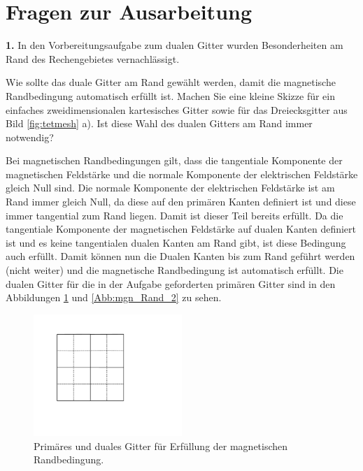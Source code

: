 \documentclass[Protokollheft.tex]{subfiles}
\begin{document}
\section{Fragen zur Ausarbeitung}

\begin{framed}
	\noindent \textbf{1.} In den Vorbereitungsaufgabe zum dualen Gitter wurden
Besonderheiten am Rand des Rechengebietes vernachlässigt.

Wie sollte das duale Gitter am Rand gewählt werden, damit die magnetische
Randbedingung automatisch erfüllt ist. Machen Sie eine kleine Skizze
für ein einfaches zweidimensionalen kartesisches Gitter sowie für
das Dreiecksgitter aus Bild \ref{fig:tetmesh} a). Ist diese Wahl
des dualen Gitters am Rand immer notwendig?\label{exer:autoHomNeumann}
\end{framed}
\noindent
Bei magnetischen Randbedingungen gilt, dass die tangentiale Komponente der magnetischen Feldstärke und die normale Komponente der elektrischen Feldstärke gleich Null sind. Die normale Komponente der elektrischen Feldstärke ist am Rand immer gleich Null, da diese auf den primären Kanten definiert ist und diese immer tangential zum Rand liegen. Damit ist dieser Teil bereits erfüllt. Da die tangentiale Komponente der magnetischen Feldstärke auf dualen Kanten definiert ist und es keine tangentialen dualen Kanten am Rand gibt, ist diese Bedingung auch erfüllt. Damit können nun die Dualen Kanten bis zum Rand geführt werden (nicht weiter) und die magnetische Randbedingung ist automatisch erfüllt. Die dualen Gitter für die in der Aufgabe geforderten primären Gitter sind in den Abbildungen \ref{Abb:mgn_Rand_1} und \ref{Abb:mgn_Rand_2} zu sehen.
\begin{figure}[h]
	\centering
	\includegraphics[trim = 30mm 35mm 70mm 15mm, clip,width=0.5\textwidth]{mgn_Rand_1.pdf}
	\caption{Primäres und duales Gitter für Erfüllung der magnetischen Randbedingung.}
	\label{Abb:mgn_Rand_1}
\end{figure}
\end{document}
